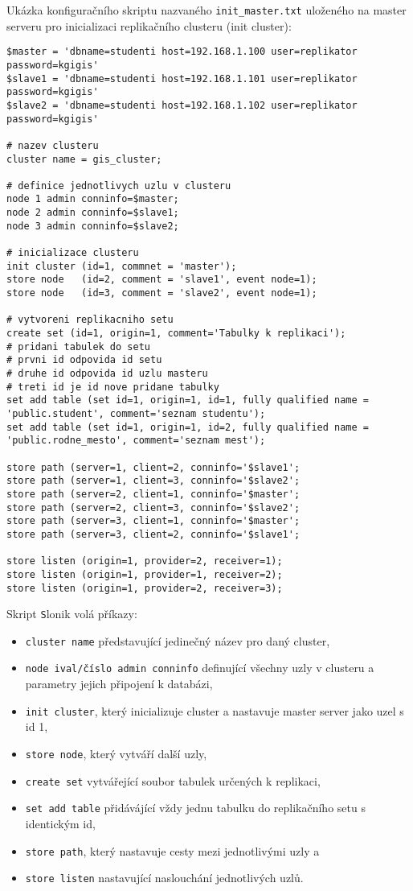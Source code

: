 Ukázka konfiguračního skriptu nazvaného \texttt{init\_master.txt} uloženého na master serveru pro inicializaci replikačního clusteru (init cluster):
\begin{lstlisting}[identifierstyle=\color{black},stringstyle=\color{black},keywordstyle=\color{black}]
$master = 'dbname=studenti host=192.168.1.100 user=replikator password=kgigis'
$slave1 = 'dbname=studenti host=192.168.1.101 user=replikator password=kgigis'
$slave2 = 'dbname=studenti host=192.168.1.102 user=replikator password=kgigis'

# nazev clusteru
cluster name = gis_cluster;

# definice jednotlivych uzlu v clusteru
node 1 admin conninfo=$master;
node 2 admin conninfo=$slave1;
node 3 admin conninfo=$slave2;

# inicializace clusteru
init cluster (id=1, commnet = 'master');
store node   (id=2, comment = 'slave1', event node=1);
store node   (id=3, comment = 'slave2', event node=1);

# vytvoreni replikacniho setu
create set (id=1, origin=1, comment='Tabulky k replikaci');
# pridani tabulek do setu
# prvni id odpovida id setu
# druhe id odpovida id uzlu masteru
# treti id je id nove pridane tabulky
set add table (set id=1, origin=1, id=1, fully qualified name = 'public.student', comment='seznam studentu');
set add table (set id=1, origin=1, id=2, fully qualified name = 'public.rodne_mesto', comment='seznam mest');

store path (server=1, client=2, conninfo='$slave1';
store path (server=1, client=3, conninfo='$slave2';
store path (server=2, client=1, conninfo='$master';
store path (server=2, client=3, conninfo='$slave2';
store path (server=3, client=1, conninfo='$master';
store path (server=3, client=2, conninfo='$slave1';

store listen (origin=1, provider=2, receiver=1);
store listen (origin=1, provider=1, receiver=2);
store listen (origin=1, provider=2, receiver=3);
\end{lstlisting}

Skript {\texttt Slonik} volá příkazy:
\begin{itemize}
\item \texttt{cluster name} představující jedinečný název pro daný cluster,
\item \texttt{node ival/číslo admin conninfo} definující všechny uzly v clusteru a parametry jejich připojení k databázi,
\item \texttt{init cluster}, který inicializuje cluster a nastavuje master server jako uzel s id 1, 
\item \texttt{store node}, který vytváří další uzly,
\item \texttt{create set} vytvářející soubor tabulek určených k replikaci, 
\item \texttt{set add table} přidávájící vždy jednu tabulku do replikačního setu s identickým id,
\item \texttt{store path}, který nastavuje cesty mezi jednotlivými uzly a 
\item \texttt{store listen} nastavující naslouchání jednotlivých uzlů. 
\end{itemize}

